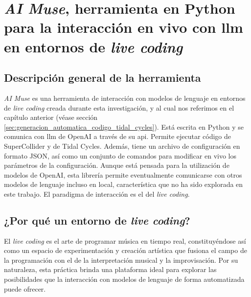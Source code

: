 \chapter{\emph{AI Muse}, herramienta en {Python} para la interacción en vivo con \gls{llm} en entornos de \emph{live coding}}
\label{chap:ai_muse}



\section{Descripción general de la herramienta}

\emph{AI Muse} es una herramienta de interacción con modelos de lenguaje en entornos de \emph{live coding} creada durante esta investigación, y al cual nos referimos en el capítulo anterior (véase sección \ref{sec:generacion_automatica_codigo_tidal_cycles}). Está escrita en Python y se comunica con \gls{llm} de OpenAI a través de su \gls{api}. Permite ejecutar código de SuperCollider y de Tidal Cycles. Además, tiene un archivo de configuración en formato JSON, así como un conjunto de comandos para modificar en vivo los parámetros de la configuración. Aunque está pensada para la utilización de modelos de OpenAI, esta librería permite eventualmente comunicarse con otros modelos de lenguaje incluso en local, característica que no ha sido explorada en este trabajo. El paradigma de interacción es el del \emph{live coding}.

\section{¿Por qué un entorno de \emph{live coding}?}

El \emph{live coding} es el arte de programar música en tiempo real, constituyéndose así como un espacio de experimentación y creación artística que fusiona el campo de la programación con el de la interpretación musical y la improvisación. Por su naturaleza, esta práctica brinda una plataforma ideal para explorar las posibilidades que la interacción con modelos de lenguaje de forma automatizada puede ofrecer.

